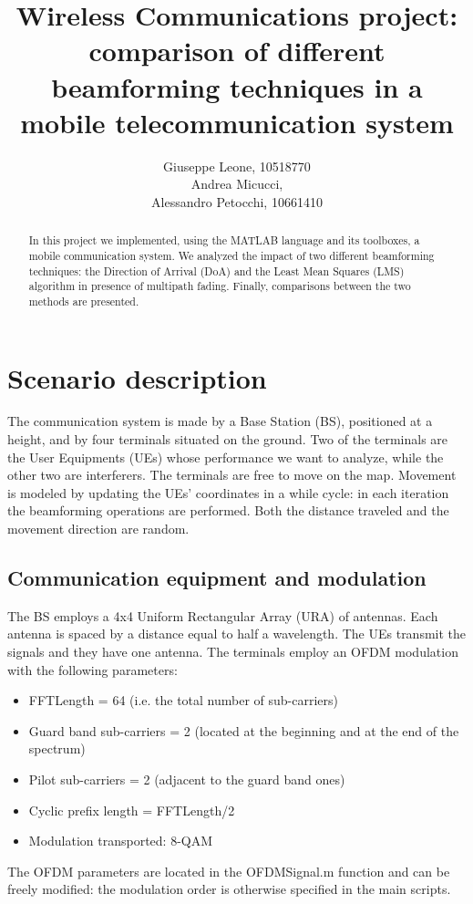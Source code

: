 \documentclass[a4paper,10pt]{article}
\title{Wireless Communications project: comparison of different beamforming techniques in a mobile telecommunication system}
\author{Giuseppe Leone, 10518770 \\ Andrea Micucci, \\ Alessandro Petocchi, 10661410}
\begin{document}
\maketitle
\begin{abstract}
In this project we implemented, using the MATLAB language and its toolboxes, a mobile communication system. We analyzed the impact of two different beamforming techniques: the Direction of Arrival (DoA) and the Least Mean Squares (LMS) algorithm in presence of multipath fading. Finally, comparisons between the two methods are presented.
\end{abstract}
\section{Scenario description}
The communication system is made by a Base Station (BS), positioned at a height, and by four terminals situated on the ground. Two of the terminals are the User Equipments (UEs) whose performance we want to analyze, while the other two are interferers. 
The terminals are free to move on the map. Movement is modeled by updating the UEs' coordinates in a while cycle: in each iteration the beamforming operations are performed. Both the distance traveled and the movement direction are random.
\subsection{Communication equipment and modulation}
The BS employs a 4x4 Uniform Rectangular Array (URA) of antennas. Each antenna is spaced by a distance equal to half a wavelength. The UEs transmit the signals and they have one antenna. The terminals employ an OFDM modulation with the following parameters:
\begin{itemize}
	\item FFTLength = 64 (i.e. the total number of sub-carriers)
	\item Guard band sub-carriers = 2 (located at the beginning and at the end of the spectrum)
	\item Pilot sub-carriers = 2 (adjacent to the guard band ones)
	\item Cyclic prefix length = FFTLength/2
	\item Modulation transported: 8-QAM
\end{itemize}
The OFDM parameters are located in the OFDMSignal.m function and can be freely modified: the modulation order is otherwise specified in the main scripts.
\end{document}
